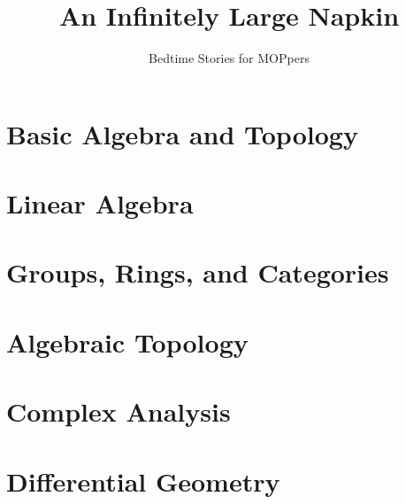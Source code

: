 \documentclass[11pt]{scrreprt}
\begin{document}
\title{An Infinitely Large Napkin}
\subtitle{Bedtime Stories for MOPpers}
\maketitle



\tableofcontents




\part{Basic Algebra and Topology}







\part{Linear Algebra}

\part{Groups, Rings, and Categories}




\part{Algebraic Topology}


\part{Complex Analysis}




\part{Differential Geometry}
\end{document}
